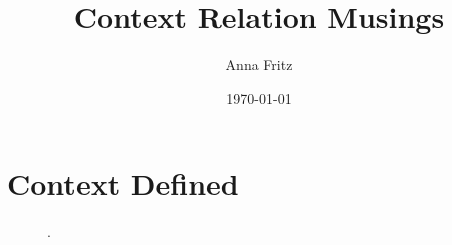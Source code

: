 \documentclass[12pt, letterpaper]{article}
\title{Context Relation Musings}
\author{Anna Fritz}
\date{\today}
\begin{document}
\maketitle

\section{Context Defined}

\begin{figure}[hbtp]
    \centering 
    \caption[Attestation architecture]{.}
    \label{fig:architecture-fig}
  \end{figure}
\end{document}

